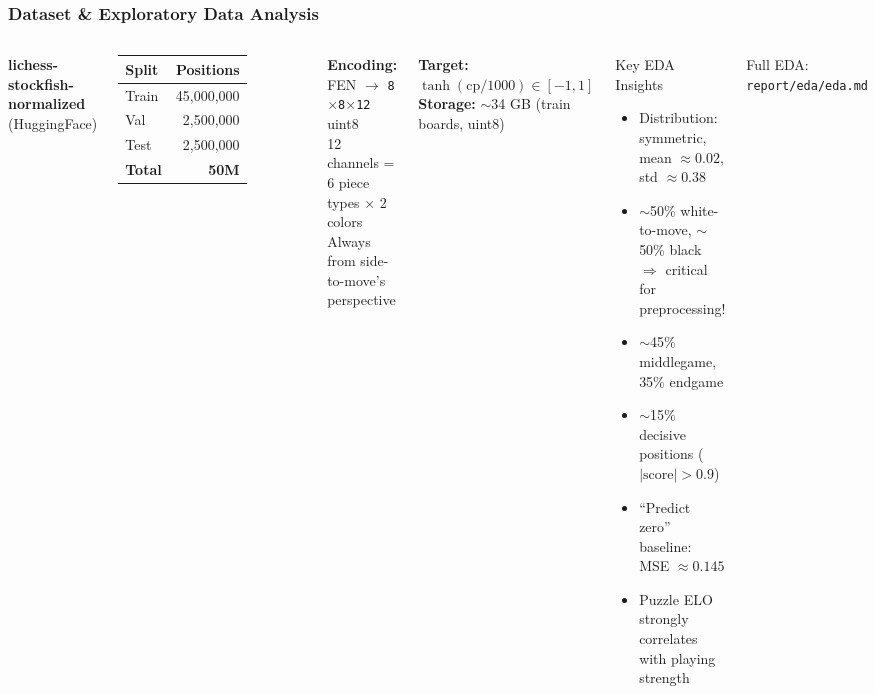 \documentclass{beamer}
\begin{document}
\begin{frame}
\frametitle{Dataset \& Exploratory Data Analysis}

\begin{columns}

\textbf{lichess-stockfish-normalized} (HuggingFace)
\vspace{0.3em}
\begin{tabular}{lr}
\toprule
\textbf{Split} & \textbf{Positions} \\
\midrule
Train & 45,000,000 \\
Val   & 2,500,000  \\
Test  & 2,500,000  \\
\midrule
\textbf{Total} & \textbf{50M} \\
\bottomrule
\end{tabular}

\vspace{0.5em}
\textbf{Encoding:} FEN $\rightarrow$ \texttt{8$\times$8$\times$12} uint8\\
{\footnotesize 12 channels = 6 piece types $\times$ 2 colors\\
Always from side-to-move's perspective}

\vspace{0.3em}
\textbf{Target:} $\tanh(\text{cp} / 1000) \in [-1, 1]$\\
\textbf{Storage:} $\sim$34 GB (train boards, uint8)


\begin{block}{Key EDA Insights}
\footnotesize
\begin{itemize}
  \item Distribution: symmetric, mean $\approx 0.02$, std $\approx 0.38$
  \item $\sim$50\% white-to-move, $\sim$50\% black \\ \alert{$\Rightarrow$ critical for preprocessing!}
  \item $\sim$45\% middlegame, 35\% endgame
  \item $\sim$15\% decisive positions ($|\text{score}|>0.9$)
  \item ``Predict zero'' baseline: MSE $\approx 0.145$
  \item Puzzle ELO strongly correlates with playing strength
\end{itemize}
\end{block}

\vspace{0.3em}
{\footnotesize Full EDA: \texttt{report/eda/eda.md}}

\end{columns}

\end{frame}
\end{document}
